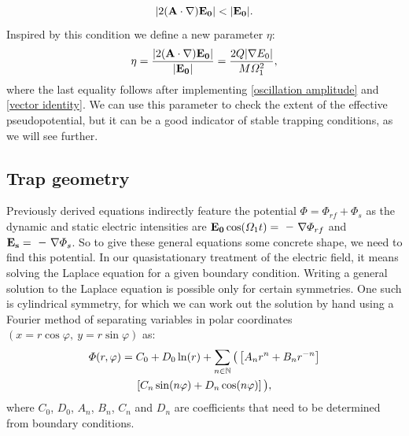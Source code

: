 \begin{equation}
	|2(\vb{A} \cdot \nabla)\vb{E_0}| < |\vb{E_0}|.
\end{equation}
Inspired by this condition we define a new parameter $\eta$:
\begin{equation}
	\eta = \dfrac{|2(\vb{A} \cdot \nabla)\vb{E_0}|}{|\vb{E_0}|} = \dfrac{2Q|\nabla E_0|}{M\Omega_1^2},
\end{equation}
where the last equality follows after implementing \eqref{oscillation amplitude} and \eqref{vector identity}. We can use this parameter to check the extent of the effective pseudopotential, but it can be a good indicator of stable trapping conditions, as we will see further.

\subsection{Trap geometry}
Previously derived equations indirectly feature the potential $\Phi = \Phi_{rf} + \Phi_s$ as the dynamic and static electric intensities are $\vb{E_0}\cos(\Omega_1 t) = \minus\nabla \Phi_{rf}$ and $\vb{E_s} = \minus\nabla \Phi_s$. So to give these general equations some concrete shape, we need to find this potential. In our quasistationary treatment of the electric field, it means solving the Laplace equation for a given boundary condition. Writing a general solution to the Laplace equation is possible only for certain symmetries. One such is cylindrical symmetry, for which we can work out the solution by hand using a Fourier method of separating variables in polar coordinates $(x=r \cos\varphi, \ y=r \sin\varphi)$ as:
\begin{multline}
	\label{cylindrical symmetry potential}
	\Phi(r, \varphi) = C_0 + D_0 \ln(r) + \sum_{n \in \mathbb{N}} \big( \left[A_n r^{n} + B_n r^{-n} \right] \\ 
	\left[ C_n \sin(n\varphi) + D_n \cos(n\varphi) \right] \big),
\end{multline}
where $C_0$, $D_0$, $A_n$, $B_n$, $C_n$ and $D_n$ are coefficients that need to be determined from boundary conditions. 

